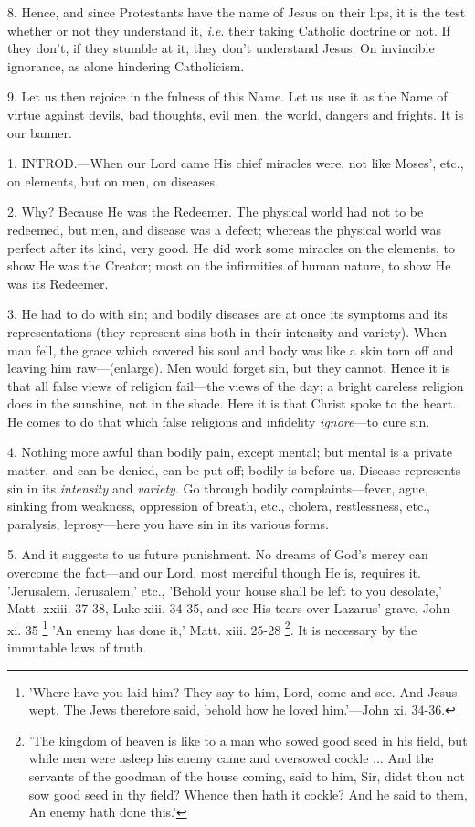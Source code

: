 8. Hence, and since Protestants have the name of
Jesus on their lips, it is the test whether or not they understand it,
\emph{i.e}. their taking Catholic doctrine or not. If they don't, if
they stumble at it, they don't understand Jesus. On invincible
ignorance, as alone hindering Catholicism.

9. Let us then rejoice in the fulness of this
Name. Let us use it as the Name of virtue against devils, bad
thoughts, evil men, the world, dangers and frights. It is our banner.


1. INTROD.—When
our Lord came His chief miracles were, not like Moses', etc., on
elements, but on men, on diseases.

2. Why? Because He was the Redeemer. The physical
world had not to be redeemed, but men, and disease was a defect;
whereas the physical world was perfect after its kind, very good. He
did work some miracles on the elements, to show He was the Creator;
most on the infirmities of human nature, to show He was its Redeemer.

3. He had to do with sin; and bodily diseases are
at once its symptoms and its representations (they represent sins both
in their intensity and variety). When man fell, the grace which
covered his soul and body was like a skin torn off and leaving him
raw—(enlarge). Men would forget sin, but they cannot. Hence it is
that all false views of religion fail—the views of the day; a bright
careless religion does in the sunshine, not in the shade. Here it is
that Christ spoke to the heart. He comes to do that which false
religions and infidelity \emph{ignore}—to cure sin.

4. Nothing more awful than bodily pain, except
mental; but mental is a private matter, and can be denied, can be put
off; bodily is before us. Disease represents sin in its \emph{intensity}
and \emph{variety}. Go through bodily complaints—fever, ague,
sinking from weakness, oppression of breath, etc., cholera,
restlessness, etc., paralysis, leprosy—here you have sin in its
various forms.

5. And it suggests to us future punishment. No
dreams of God's mercy can overcome the fact—and our Lord, most
merciful though He is, requires it. 'Jerusalem, Jerusalem,' etc.,
'Behold your house shall be left to you desolate,' Matt. xxiii. 37-38,
Luke xiii. 34-35, and see His tears over Lazarus' grave, John xi. 35 \footnote{'Where have you laid
him? They say to him, Lord, come and see. And Jesus wept. The Jews
therefore said, behold how he loved him.'—John xi. 34-36.} 'An enemy has done it,' Matt. xiii. 25-28 \footnote{'The kingdom of heaven
is like to a man who sowed good seed in his field, but while men were
asleep his enemy came and oversowed cockle ... And the servants of the
goodman of the house coming, said to him, Sir, didst thou not sow good
seed in thy field? Whence then hath it cockle? And he said to them, An
enemy hath done this.'}. It is necessary by the immutable laws of truth.

